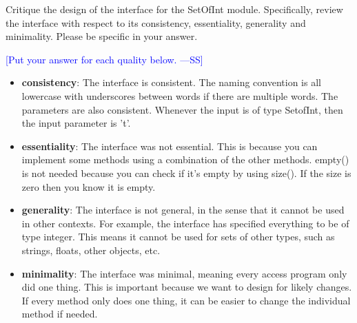\documentclass[12pt,fleqn]{examtst}
\newcommand{\authornote}[3]{\textcolor{#1}{[#3 ---#2]}}
\newcommand{\authornote}[3]{}
\newcommand{\wss}[1]{\authornote{blue}{SS}{#1}}
\begin{document}
\noindent
\begin{minipage}{\textwidth}

Critique the design of the interface for the SetOfInt module.  Specifically,
review the interface with respect to its consistency, essentiality, generality
and minimality.  Please be specific in your answer.

\wss{Put your answer for each quality below.}

\begin{itemize}
\item \textbf{consistency}: The interface is consistent. The naming convention is all lowercase with underscores between words if there are multiple words. The parameters are also consistent. Whenever the input is of type SetofInt, then the input parameter is 't'.
\item \textbf{essentiality}: The interface was not essential. This is because you can implement some methods using a combination of the other methods. empty() is not needed because you can check if it's empty by using size(). If the size is zero then you know it is empty.
\item \textbf{generality}: The interface is not general, in the sense that it cannot be used in other contexts. For example, the interface has specified everything to be of type integer. This means it cannot be used for sets of other types, such as strings, floats, other objects, etc.
\item \textbf{minimality}: The interface was minimal, meaning every access program only did one thing. This is important because we want to design for likely changes. If every method only does one thing, it can be easier to change the individual method if needed.
\end{itemize}

\end{minipage}


\newpage
\end{document}
